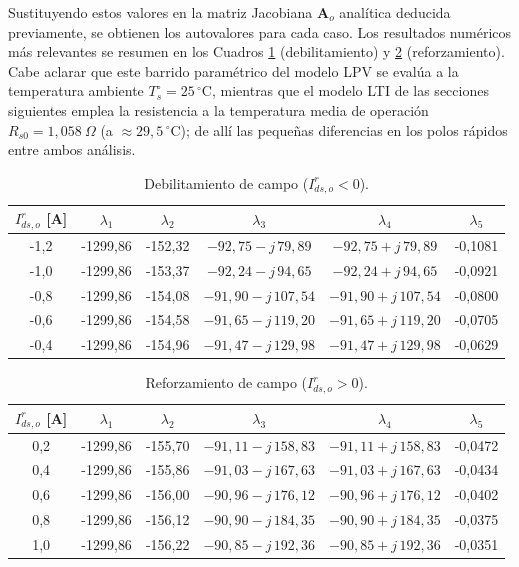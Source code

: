 \documentclass[12pt, a4paper,journal, onecolumn, compsoc]{IEEEtran}
\begin{document}
Sustituyendo estos valores en la matriz Jacobiana $\bm{A}_o$ analítica deducida previamente, se obtienen los autovalores para cada caso. Los resultados numéricos más relevantes se resumen en los Cuadros \ref{tab:migracion_polos} (debilitamiento) y \ref{tab:migracion_polos_reforzamiento} (reforzamiento). Cabe aclarar que este barrido paramétrico del modelo LPV se evalúa a la temperatura ambiente $T_s^\circ = 25\,^\circ$C, mientras que el modelo LTI de las secciones siguientes emplea la resistencia a la temperatura media de operación $R_{s0}=1{,}058\ \Omega$ (a $\approx 29{,}5\,^\circ$C); de allí las pequeñas diferencias en los polos rápidos entre ambos análisis.


\begin{table}[H]
\centering
\caption{Debilitamiento de campo ($I^r_{ds,o}<0$).}
\label{tab:migracion_polos}
\begin{tabular}{|c|c|c|c|c|c|}
\hline
$I^r_{ds,o}$ [A] & $\lambda_1$ & $\lambda_2$ & $\lambda_3$ & $\lambda_4$ & $\lambda_5$ \\
\hline
-1{,}2 & -1299{,}86 & -152{,}32 & $-92{,}75 - j\,79{,}89$ & $-92{,}75 + j\,79{,}89$ & -0{,}1081 \\
-1{,}0 & -1299{,}86 & -153{,}37 & $-92{,}24 - j\,94{,}65$ & $-92{,}24 + j\,94{,}65$ & -0{,}0921 \\
-0{,}8 & -1299{,}86 & -154{,}08 & $-91{,}90 - j\,107{,}54$ & $-91{,}90 + j\,107{,}54$ & -0{,}0800 \\
-0{,}6 & -1299{,}86 & -154{,}58 & $-91{,}65 - j\,119{,}20$ & $-91{,}65 + j\,119{,}20$ & -0{,}0705 \\
-0{,}4 & -1299{,}86 & -154{,}96 & $-91{,}47 - j\,129{,}98$ & $-91{,}47 + j\,129{,}98$ & -0{,}0629 \\
\hline
\end{tabular}
\end{table}

\begin{table}[H]
\centering
\caption{Reforzamiento de campo ($I^r_{ds,o}>0$).}
\label{tab:migracion_polos_reforzamiento}
\begin{tabular}{|c|c|c|c|c|c|}
\hline
$I^r_{ds,o}$ [A] & $\lambda_1$ & $\lambda_2$ & $\lambda_3$ & $\lambda_4$ & $\lambda_5$ \\
\hline
0{,}2 & -1299{,}86 & -155{,}70 & $-91{,}11 - j\,158{,}83$ & $-91{,}11 + j\,158{,}83$ & -0{,}0472 \\
0{,}4 & -1299{,}86 & -155{,}86 & $-91{,}03 - j\,167{,}63$ & $-91{,}03 + j\,167{,}63$ & -0{,}0434 \\
0{,}6 & -1299{,}86 & -156{,}00 & $-90{,}96 - j\,176{,}12$ & $-90{,}96 + j\,176{,}12$ & -0{,}0402 \\
0{,}8 & -1299{,}86 & -156{,}12 & $-90{,}90 - j\,184{,}35$ & $-90{,}90 + j\,184{,}35$ & -0{,}0375 \\
1{,}0 & -1299{,}86 & -156{,}22 & $-90{,}85 - j\,192{,}36$ & $-90{,}85 + j\,192{,}36$ & -0{,}0351 \\
\hline
\end{tabular}
\end{table}
\end{document}
